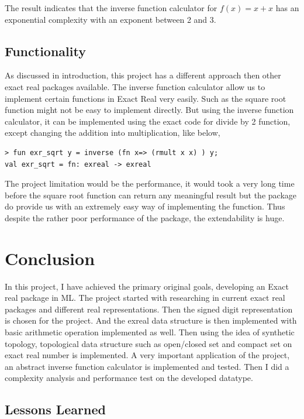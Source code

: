 \documentclass[12pt,twoside,notitlepage]{report}
\begin{document}
The result indicates that the inverse function calculator for $f(x) = x+x$ has an exponential complexity with an exponent between 2 and 3.


\section{Functionality}
As discussed in introduction, this project has a different approach then other exact real packages available. The inverse function calculator allow us to implement certain functions in Exact Real very easily. Such as the square root function might not be easy to implement directly. But using the inverse function calculator, it can be implemented using the exact code for divide by 2 function, except changing the addition into multiplication, like below, 

{
\begin{verbatim}
> fun exr_sqrt y = inverse (fn x=> (rmult x x) ) y;
val exr_sqrt = fn: exreal -> exreal
\end{verbatim}
} 

The project limitation would be the performance, it would took a very long time before the square root function can return any meaningful result but the package do provide us with an extremely easy way of implementing the function.
Thus despite the rather poor performance of the package, the extendability is huge.



\chapter{Conclusion}

In this project, I have achieved the primary original goals, developing an Exact real package in ML. The project started with researching in current exact real packages and different real representations. Then the signed digit representation is chosen for the project. And the exreal data structure is then implemented with basic arithmetic operation implemented as well. Then using the idea of synthetic topology, topological data structure such as open/closed set and compact set on exact real number is implemented. A very important application of the project, an abstract inverse function calculator is implemented and tested. Then I did a complexity analysis and performance test on the developed datatype. 

\section{Lessons Learned}
\end{document}
